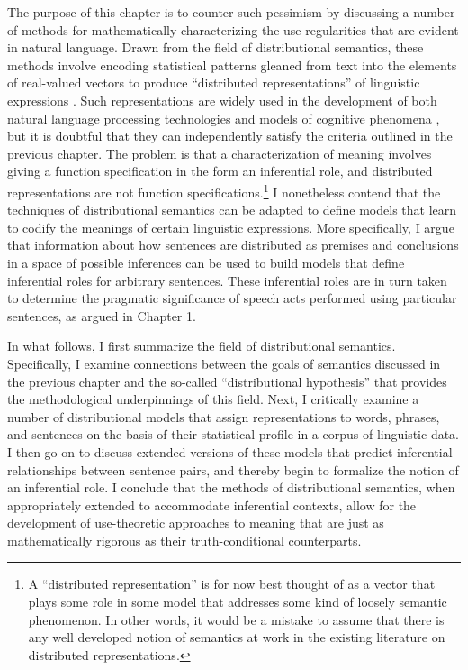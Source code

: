 The purpose of this chapter is to counter such pessimism by discussing a number of methods for mathematically characterizing the use-regularities that are evident in natural language. Drawn from the field of distributional semantics, these methods involve encoding statistical patterns gleaned from text into the elements of real-valued vectors to produce ``distributed representations'' of linguistic expressions \citep{TurneyPantel:2010,LandauerDumais:1997,Baroni:2014,Sahlgren:2005}. Such representations are widely used in the development of both natural language processing technologies and models of cognitive phenomena \citep{Manning:2015, LandauerDumais:1997,TurneyPantel:2010,Baroni:2014,JonesMewhort:2007,Fishbein:2008,Carrillo:2009}, but it is doubtful that they can independently satisfy the criteria outlined in the previous chapter. The problem is that a characterization of meaning involves giving a function specification in the form an inferential role, and distributed representations are not function specifications.\footnote{A ``distributed representation'' is for now best thought of as a vector that plays some role in some model that addresses some kind of loosely semantic phenomenon. In other words, it would be a mistake to assume that there is any well developed notion of semantics at work in the existing literature on distributed representations.} I nonetheless contend that the techniques of distributional semantics can be adapted to define models that learn to codify the meanings of certain linguistic expressions. More specifically, I argue that information about how sentences are distributed as premises and conclusions in a space of possible inferences can be used to build models that define inferential roles for arbitrary sentences. These inferential roles are in turn taken to determine the pragmatic significance of speech acts performed using particular sentences, as argued in Chapter 1.

In what follows, I first summarize the field of distributional semantics. Specifically, I examine connections between the goals of semantics discussed in the previous chapter and the so-called ``distributional hypothesis'' that provides the methodological underpinnings of this field. Next, I critically examine a number of distributional models that assign representations to words, phrases, and sentences on the basis of their statistical profile in a corpus of linguistic data. I then go on to discuss extended versions of these models that predict inferential relationships between sentence pairs, and thereby begin to formalize the notion of an inferential role. I conclude that the methods of distributional semantics, when appropriately extended to accommodate inferential contexts, allow for the development of use-theoretic approaches to meaning that are just as mathematically rigorous as their truth-conditional counterparts. 

